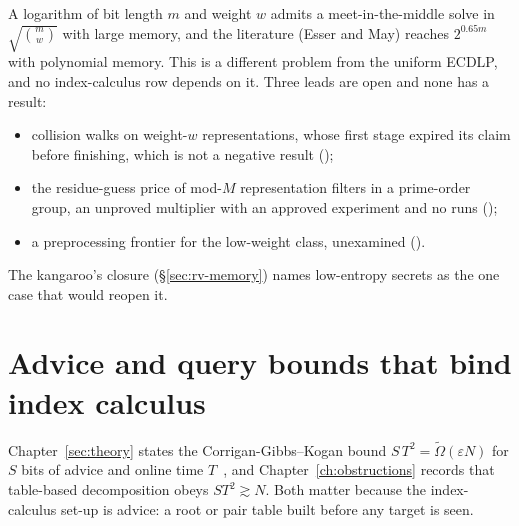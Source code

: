 A logarithm of bit length $m$ and weight $w$ admits a meet-in-the-middle
solve in $\sqrt{\binom mw}$ with large memory, and the literature (Esser and
May) reaches $2^{0.65m}$ with polynomial memory. This is a different
problem from the uniform ECDLP, and no index-calculus row depends on it.
Three leads are open and none has a result:
\begin{itemize}
\item collision walks on weight-$w$ representations, whose first stage
  expired its claim before finishing, which is not a negative result
  ();
\item the residue-guess price of mod-$M$ representation filters in a
  prime-order group, an unproved multiplier with an approved experiment and
  no runs ();
\item a preprocessing frontier for the low-weight class, unexamined
  ().
\end{itemize}
The kangaroo's closure (\S\ref{sec:rv-memory}) names low-entropy secrets as
the one case that would reopen it.

\section{Advice and query bounds that bind index calculus}\label{sec:gf-advice}

Chapter~\ref{sec:theory} states the Corrigan-Gibbs--Kogan bound
$S\,T^2=\tilde\Omega(\varepsilon N)$ for $S$ bits of advice and online time
$T$~\cite{cgk2018}, and Chapter~\ref{ch:obstructions} records that
table-based decomposition obeys $ST^2\gtrsim N$. Both matter because the
index-calculus set-up is advice: a root or pair table built before any
target is seen.

